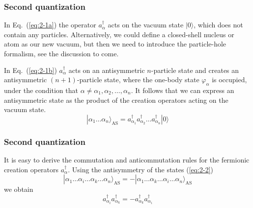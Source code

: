 \documentclass{beamer}
\begin{document}
\begin{frame}
\frametitle{Second quantization}

\begin{block}{}
In Eq.~(\ref{eq:2-1a}) 
the operator  $a_\alpha^{\dagger}$  acts on the vacuum state 
$|0\rangle$, which does not contain any particles. Alternatively, we could define  a closed-shell nucleus or atom as our new vacuum, but then
we need to introduce the particle-hole  formalism, see the discussion to come. 

In Eq.~(\ref{eq:2-1b}) $a_\alpha^{\dagger}$ acts on an antisymmetric $n$-particle state and 
creates an antisymmetric $(n+1)$-particle state, where the one-body state 
$\varphi_\alpha$ is occupied, under the condition that
$\alpha \ne \alpha_1, \alpha_2, \dots, \alpha_n$. 
It follows that we can express an antisymmetric state as the product of the creation
operators acting on the vacuum state.  
\begin{equation}
	|\alpha_1\dots \alpha_n\rangle_{\mathrm{AS}} = a_{\alpha_1}^{\dagger} a_{\alpha_2}^{\dagger} \dots a_{\alpha_n}^{\dagger} |0\rangle \label{eq:2-2}
\end{equation}
\end{block}
\end{frame}

\begin{frame}
\frametitle{Second quantization}

\begin{block}{}
It is easy to derive the commutation and anticommutation rules  for the fermionic creation operators 
$a_\alpha^{\dagger}$. Using the antisymmetry of the states 
(\ref{eq:2-2})
\begin{equation}
	|\alpha_1\dots \alpha_i\dots \alpha_k\dots \alpha_n\rangle_{\mathrm{AS}} = 
		- |\alpha_1\dots \alpha_k\dots \alpha_i\dots \alpha_n\rangle_{\mathrm{AS}} \label{eq:2-3a}
\end{equation}
we obtain
\begin{equation}
	 a_{\alpha_i}^{\dagger}  a_{\alpha_k}^{\dagger} = - a_{\alpha_k}^{\dagger} a_{\alpha_i}^{\dagger} \label{eq:2-3b}
\end{equation}
\end{block}
\end{frame}
\end{document}
